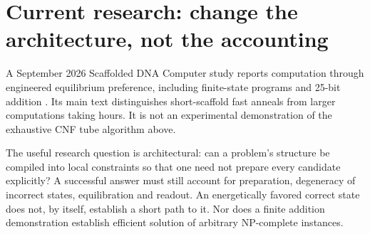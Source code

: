\section{Current research: change the architecture, not the accounting}
A September 2026 Scaffolded DNA Computer study reports computation through
engineered equilibrium preference, including finite-state programs and
25-bit addition \cite{sdc}. Its main text distinguishes short-scaffold
fast anneals from larger computations taking hours. It is not an
experimental demonstration of the exhaustive CNF tube algorithm above.

The useful research question is architectural: can a problem's structure
be compiled into local constraints so that one need not prepare every
candidate explicitly? A successful answer must still account for
preparation, degeneracy of incorrect states, equilibration and readout.
An energetically favored correct state does not, by itself, establish a
short path to it. Nor does a finite addition demonstration establish
efficient solution of arbitrary NP-complete instances.

